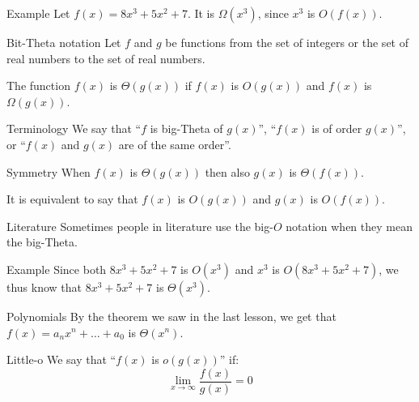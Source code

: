 \documentclass[a4paper]{article}
\begin{document}
\begin{parag}{Example}
    Let $f\left(x\right) = 8x^3 + 5x^2 + 7$. It is $\Omega\left(x^3\right)$, since $x^3$ is $O\left(f\left(x\right)\right)$.
\end{parag}

\begin{parag}{Bit-Theta notation}
    Let $f$ and $g$ be functions from the set of integers or the set of real numbers to the set of real numbers.

    The function $f\left(x\right)$ is $\Theta\left(g\left(x\right)\right)$ if $f\left(x\right)$ is $O\left(g\left(x\right)\right)$ and $f\left(x\right)$ is $\Omega\left(g\left(x\right)\right)$.

    \begin{subparag}{Terminology}
        We say that ``$f$ is big-Theta of $g\left(x\right)$'', ``$f\left(x\right)$ is of order $g\left(x\right)$'', or ``$f\left(x\right)$ and $g\left(x\right)$ are of the same order''.
    \end{subparag}

    \begin{subparag}{Symmetry}
        When $f\left(x\right)$ is $\Theta\left(g\left(x\right)\right)$ then also $g\left(x\right)$ is $\Theta\left(f\left(x\right)\right)$.

        It is equivalent to say that $f\left(x\right)$ is $O\left(g\left(x\right)\right)$ and $g\left(x\right)$ is $O\left(f\left(x\right)\right)$.
    \end{subparag}

    \begin{subparag}{Literature}
        Sometimes people in literature use the big-$O$ notation when they mean the big-Theta.
    \end{subparag}
\end{parag}

\begin{parag}{Example}
    Since both $8x^3 + 5x^2 + 7$ is $O\left(x^3\right)$ and $x^3$ is $O\left(8x^3 + 5x^2 + 7\right)$, we thus know that $8x^3 + 5x^2 + 7$ is $\Theta\left(x^3\right)$.
\end{parag}

\begin{parag}{Polynomials}
    By the theorem we saw in the last lesson, we get that $f\left(x\right) = a_nx^{n} + \ldots + a_0$ is $\Theta\left(x^{n}\right)$.
\end{parag}

\begin{parag}{Little-o}
    We say that ``$f\left(x\right)$ is $o\left(g\left(x\right)\right)$'' if:
    \[\lim_{x \to \infty} \frac{f\left(x\right)}{g\left(x\right)} = 0\]
\end{parag}
\end{document}
